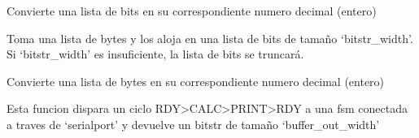 \documentclass[letterpaper,10pt,english]{sphinxmanual}
\begin{document}

\begin{fulllineitems}
\label{\detokenize{myfpga:myfpga.interfaz_pcps.bitstr_to_int}}
\pysigstartsignatures
{}
\pysigstopsignatures
\sphinxAtStartPar
Convierte una lista de bits en su
correspondiente numero decimal (entero)

\end{fulllineitems}


\begin{fulllineitems}
\label{\detokenize{myfpga:myfpga.interfaz_pcps.bytestr_to_bitstr}}
\pysigstartsignatures
{}
\pysigstopsignatures
\sphinxAtStartPar
Toma una lista de bytes y los aloja en una lista de bits
de tamaño ‘bitstr\_width’. Si ‘bitstr\_width’ es insuficiente,
la lista de bits se truncará.

\end{fulllineitems}


\begin{fulllineitems}
\label{\detokenize{myfpga:myfpga.interfaz_pcps.bytestr_to_int}}
\pysigstartsignatures
{}
\pysigstopsignatures
\sphinxAtStartPar
Convierte una lista de bytes en su
correspondiente numero decimal (entero)

\end{fulllineitems}


\begin{fulllineitems}
\label{\detokenize{myfpga:myfpga.interfaz_pcps.calc}}
\pysigstartsignatures
{}
\pysigstopsignatures
\sphinxAtStartPar
Esta funcion dispara un ciclo RDY\sphinxhyphen{}\textgreater{}CALC\sphinxhyphen{}\textgreater{}PRINT\sphinxhyphen{}\textgreater{}RDY
a una fsm conectada a traves de ‘serialport’
y devuelve un bitstr de tamaño ‘buffer\_out\_width’

\end{fulllineitems}
\end{document}
